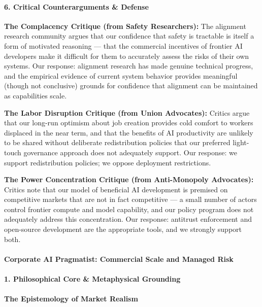 \paragraph{6. Critical Counterarguments \&
Defense}\label{critical-counterarguments-defense-14}

\textbf{The Complacency Critique (from Safety Researchers):} The
alignment research community argues that our confidence that safety is
tractable is itself a form of motivated reasoning --- that the
commercial incentives of frontier AI developers make it difficult for
them to accurately assess the risks of their own systems. Our response:
alignment research has made genuine technical progress, and the
empirical evidence of current system behavior provides meaningful
(though not conclusive) grounds for confidence that alignment can be
maintained as capabilities scale.

\textbf{The Labor Disruption Critique (from Union Advocates):} Critics
argue that our long-run optimism about job creation provides cold
comfort to workers displaced in the near term, and that the benefits of
AI productivity are unlikely to be shared without deliberate
redistribution policies that our preferred light-touch governance
approach does not adequately support. Our response: we support
redistribution policies; we oppose deployment restrictions.

\textbf{The Power Concentration Critique (from Anti-Monopoly
Advocates):} Critics note that our model of beneficial AI development is
premised on competitive markets that are not in fact competitive --- a
small number of actors control frontier compute and model capability,
and our policy program does not adequately address this concentration.
Our response: antitrust enforcement and open-source development are the
appropriate tools, and we strongly support both.

\paragraph{Corporate AI Pragmatist: Commercial Scale and Managed
Risk}\label{corporate-ai-pragmatist-commercial-scale-and-managed-risk}

\paragraph{1. Philosophical Core \& Metaphysical
Grounding}\label{philosophical-core-metaphysical-grounding-15}

\paragraph{The Epistemology of Market
Realism}\label{the-epistemology-of-market-realism}


